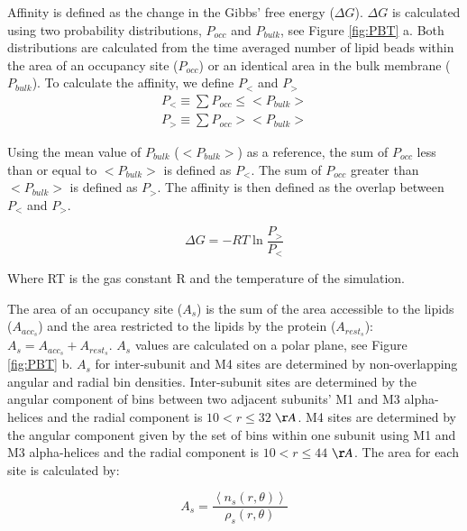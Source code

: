 \documentclass[preprint,3p,9pt,times,onecolumn]{elsarticle}
\begin{document}
Affinity is defined as the change in the Gibbs' free energy ($\Delta G$). $\Delta G$ is calculated using two probability distributions, $P_{occ}$ and $P_{bulk}$, see Figure \ref{fig:PBT} a. Both distributions are calculated from the time averaged number of lipid beads within the area of an occupancy site ($P_{occ}$) or an identical area in the bulk membrane ($P_{bulk}$).  
To calculate the affinity, we define $P_{<}$ and $P_{>}$
\begin{subequations}
    \begin{align}
    P_{<} \equiv \sum P_{occ} \leq \big< P_{bulk} \big> \label{eq:Pl} \\
    P_{>} \equiv \sum P_{occ} > \big< P_{bulk} \big> \label{eq:Pg}
    \end{align}
\end{subequations}

Using the mean value of $P_{bulk}$ ($ \big< P_{bulk} \big> $) as a reference, the sum of $P_{occ}$ less than or equal to   $\big< P_{bulk} \big> $ is defined as $P_{<}$. The sum of  $P_{occ}$ greater than  $\big< P_{bulk} \big> $ is defined as $P_{>}$. The affinity is then defined as the overlap between $P_{<}$ and $P_{>}$.

\begin{equation}
\Delta G = -RT\ln\frac{P_{>}}{P_{<}}
\label{eq:dG}
\end{equation}

Where RT is the gas constant R and the temperature of the simulation. 

The area of an occupancy site ($A_s$) is the sum of the area accessible to the lipids ($A_{acc_s}$) and the area restricted to the lipids by the protein ($A_{rest_s}$): $A_s = A_{acc_s} + A_{rest_s}$.  $A_s$ values are calculated on a polar plane, see Figure \ref{fig:PBT} b. $A_s$ for inter-subunit and M4 sites are determined by non-overlapping angular and radial bin densities. Inter-subunit sites are determined by the angular component of bins between two adjacent subunits' M1 and M3 alpha-helices and the radial component is $10<r\leq32$ $\AA $.  M4 sites are determined by the angular component given by the set of bins within one subunit using M1 and M3 alpha-helices and the radial component is $10<r\leq44$ $\AA$. The area for each site is calculated by:

\begin{equation}
    A_s = \frac{\left\langle n_s(r,\theta) \right\rangle}{\rho_s(r,\theta)}
\label{eq:A}
\end{equation}
\end{document}
